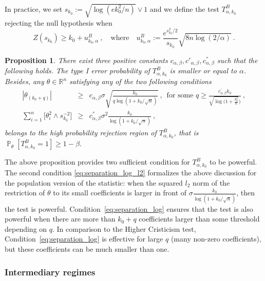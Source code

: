 \documentclass[twoside,11pt]{article}
\newtheorem{prp}{Proposition}
\def\beq{\begin{equation}}
\def\eeq{\end{equation}}
\renewcommand{\P}{\operatorname{\mathbb{P}}}
\newcommand{\<}{\langle}
\renewcommand{\>}{\rangle}
\begin{document}
\medskip



In practice, we set $s_{k_0}:= \sqrt{\log(ek^2_0/n)}\vee 1$ and we define the test $T^{B}_{\alpha,k_0}$ rejecting the null hypothesis when
\beq\label{eq:definition_Tb_alpha}
Z(s_{k_0})\geq k_0 + u^{B}_{k_0,\alpha}\ , \quad \text{where}\quad  u^{B}_{k_0,\alpha}:= \frac{e^{s_{k_0}^2/2}}{s_{k_0}} \sqrt{8n\log(2/\alpha)}\ .
\eeq

 \begin{prp}\label{cor:TB_power}
 There exist three positive constants $c_{\alpha,\beta},c'_{\alpha,\beta}, c^{''}_{\alpha,\beta}$ such that the following holds. 
  The type I error  probability of $T^{B}_{\alpha,k_0}$ is smaller or equal to $\alpha$. Besides, any $\theta\in \mathbb{R}^n$ satisfying any of the two following conditions
\begin{eqnarray}
 |\theta_{(k_0+q)}| &\geq&  c_{\alpha,\beta}\sigma \sqrt{\frac{k_0}{q\log(1+k_0/\sqrt{n})}}\ ,\, \text{ for some } q\geq  \frac{c^{'}_{\alpha,\beta}k_0}{\sqrt{\log(1+ \frac{k^2_0}{n}})}
\ , \label{eq:separation_log}
\\
 \label{eq:separation_log_l2}
 \sum_{i=1}^n \Big[\theta_i^2\wedge s^{-2}_{k_0}\Big]&\geq& c^{''}_{\alpha,\beta}\sigma^2 \frac{k_0}{\log(1+ k_0/\sqrt{n})}\ ,
\end{eqnarray}
belongs to the high probability rejection region of $T^{B}_{\alpha,k_0}$, that is $\P_{\theta}[T^{B}_{\alpha,k_0}=1]\geq 1-\beta$.


 \end{prp}

 The above proposition provides two sufficient condition for  $T^{B}_{\alpha,k_0}$ to be powerful. The second condition \eqref{eq:separation_log_l2} formalizes the above discussion for the population version of the statistic: when the squared $l_2$ norm of the restriction of $\theta$ to its small coefficients is larger in front of $\sigma \frac{k_0}{\log(1+ k_0/\sqrt{n})}$, then the test is powerful. Condition~\eqref{eq:separation_log} ensures that the test is also powerful when there are more than $k_0+q$ coefficients larger than some threshold depending on $q$. In comparison to the Higher Cristicism test, Condition~\eqref{eq:separation_log} is effective for large $q$ (many non-zero coefficients), but these coefficients can be much smaller than one. 
 

 
\subsubsection{Intermediary regimes}\label{sec:InterKV}
\end{document}
